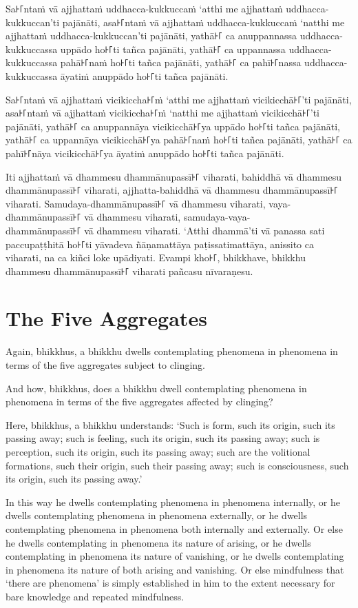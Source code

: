\paliPage

Sa꜔꜒ntaṁ vā ajjhattaṁ uddhacca-kukkuccaṁ ‘atthi me ajjhattaṁ uddhacca-kukkuccan’ti pajānāti,
asa꜔꜒ntaṁ vā ajjhattaṁ uddhacca-kukkuccaṁ ‘natthi me ajjhattaṁ uddhacca-kukkuccan’ti pajānāti,
yathā꜔꜒ ca anuppannassa uddhacca-kukkuccassa uppādo ho꜔꜒ti tañca pajānāti,
yathā꜔꜒ ca uppannassa uddhacca-kukkuccassa pahā꜔꜒naṁ ho꜔꜒ti tañca pajānāti,
yathā꜔꜒ ca pahī꜔꜒nassa uddhacca-kukkuccassa āyatiṁ anuppādo ho꜔꜒ti tañca pajānāti.

Sa꜔꜒ntaṁ vā ajjhattaṁ vicikiccha꜔꜒ṁ ‘atthi me ajjhattaṁ vicikicchā꜔꜒’ti pajānāti,
asa꜔꜒ntaṁ vā ajjhattaṁ vicikiccha꜔꜒ṁ ‘natthi me ajjhattaṁ vicikicchā꜔꜒’ti pajānāti,
yathā꜔꜒ ca anuppannāya vicikicchā꜔꜒ya uppādo ho꜔꜒ti tañca pajānāti,
yathā꜔꜒ ca uppannāya vicikicchā꜔꜒ya pahā꜔꜒naṁ ho꜔꜒ti tañca pajānāti,
yathā꜔꜒ ca pahī꜔꜒nāya vicikicchā꜔꜒ya āyatiṁ anuppādo ho꜔꜒ti tañca pajānāti.

Iti ajjhattaṁ vā dhammesu dhammānupassī꜔꜒ viharati,
bahiddhā vā dhammesu dhammānupassī꜔꜒ viharati,
ajjhatta-bahiddhā vā dhammesu dhammānupassī꜔꜒ viharati.
Samudaya-dhammānupassī꜔꜒ vā dhammesu viharati,
vaya-dhammānupassī꜔꜒ vā dhammesu viharati,
samudaya-vaya-\\ dhammānupassī꜔꜒ vā dhammesu viharati.
‘Atthi dhammā’ti vā panassa sati paccupaṭṭhitā ho꜔꜒ti
yāvadeva ñāṇamattāya paṭissatimattāya, anissito ca viharati,
na ca kiñci loke upādiyati. Evampi kho꜔꜒, bhikkhave, bhikkhu
dhammesu dhammānupassī꜔꜒ viharati pañcasu nīvaraṇesu.


\englishPage
\section{The Five Aggregates}

Again, bhikkhus, a bhikkhu dwells contemplating phenomena in phenomena in terms
of the five aggregates subject to clinging.

And how, bhikkhus, does a bhikkhu dwell contemplating phenomena in phenomena in
terms of the five aggregates affected by clinging?

Here, bhikkhus, a bhikkhu understands:
`Such is form, such its origin, such its passing away;
such is feeling, such its origin, such its passing away;
such is perception, such its origin, such its passing away;
such are the volitional formations, such their origin, such their passing away;
such is consciousness, such its origin, such its passing away.'

In this way he dwells contemplating phenomena in phenomena internally, or he
dwells contemplating phenomena in phenomena externally, or he dwells
contemplating phenomena in phenomena both internally and externally. Or else he
dwells contemplating in phenomena its nature of arising, or he dwells
contemplating in phenomena its nature of vanishing, or he dwells contemplating
in phenomena its nature of both arising and vanishing. Or else mindfulness that
‘there are phenomena’ is simply established in him to the extent necessary for
bare knowledge and repeated mindfulness.

